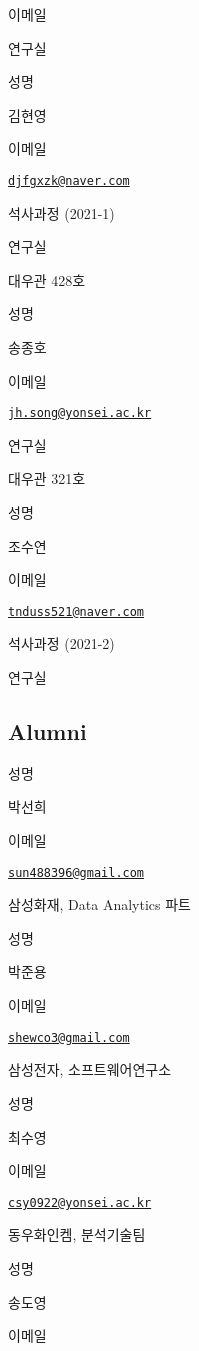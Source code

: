 \documentclass[]{book}
\begin{document}
이메일

연구실

성명

김현영

이메일

\href{mailto:djfgxzk@naver.com}{\nolinkurl{djfgxzk@naver.com}}

석사과정 (2021-1)

연구실

대우관 428호

성명

송종호

이메일

\href{mailto:jh.song@yonsei.ac.kr}{\nolinkurl{jh.song@yonsei.ac.kr}}

연구실

대우관 321호

성명

조수연

이메일

\href{mailto:tnduss521@naver.com}{\nolinkurl{tnduss521@naver.com}}

석사과정 (2021-2)

연구실

\hypertarget{alumni}{%
\subsection*{Alumni}\label{alumni}}

성명

박선희

이메일

\href{mailto:sun488396@gmail.com}{\nolinkurl{sun488396@gmail.com}}

삼성화재, Data Analytics 파트

성명

박준용

이메일

\href{mailto:shewco3@gmail.com}{\nolinkurl{shewco3@gmail.com}}

삼성전자, 소프트웨어연구소

성명

최수영

이메일

\href{mailto:csy0922@yonsei.ac.kr}{\nolinkurl{csy0922@yonsei.ac.kr}}

동우화인켐, 분석기술팀

성명

송도영

이메일
\end{document}
